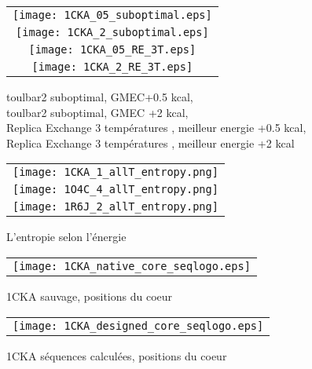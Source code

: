     \begin{figure}[h]
      \centering
      \begin{tabular}{c} 
        \texttt{[image: 1CKA\_05\_suboptimal.eps]} \\
        \texttt{[image: 1CKA\_2\_suboptimal.eps]} \\
        \texttt{[image: 1CKA\_05\_RE\_3T.eps]} \\
        \texttt{[image: 1CKA\_2\_RE\_3T.eps]} 
      \end{tabular}
  \caption[]
    {\og toulbar2 suboptimal\fg , GMEC+0.5 kcal, \\ 
      \og toulbar2 suboptimal\fg , GMEC +2 kcal, \\
      \og Replica Exchange 3 températures \fg , meilleur energie +0.5 kcal, \\
      \og Replica Exchange 3 températures \fg , meilleur energie +2 kcal
    \endtabular}

  \label{graph:seqlogo1CKA}
    \end{figure}

    \clearpage


    \begin{figure}[h]
      \centering
      \begin{tabular}{c} 
        \texttt{[image: 1CKA\_1\_allT\_entropy.png]} \\
        \texttt{[image: 1O4C\_4\_allT\_entropy.png]} \\
        \texttt{[image: 1R6J\_2\_allT\_entropy.png]} \\
      \end{tabular}
        
      \caption{L'entropie selon l'énergie}
\label{graph:entropie_8walkers}
    \end{figure}



    \clearpage

    \begin{figure}[h]
      \centering
      \begin{tabular}{c} 
        \texttt{[image: 1CKA\_native\_core\_seqlogo.eps]} \\
      \end{tabular}
        
      \caption{1CKA sauvage, positions du coeur}
\label{}
    \end{figure}

    \begin{figure}[h]
      \centering
      \begin{tabular}{c} 
        \texttt{[image: 1CKA\_designed\_core\_seqlogo.eps]} \\
      \end{tabular}
        
      \caption{1CKA séquences calculées, positions du coeur}
\label{}
    \end{figure}

